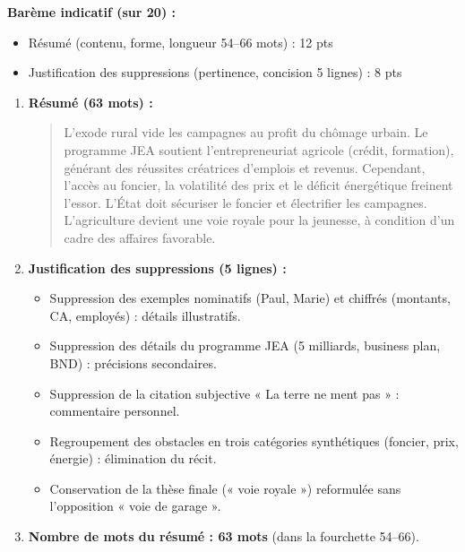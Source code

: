 \documentclass[11pt]{article}
\begin{document}
\begin{corrige}
\textbf{Barème indicatif (sur 20) :}
\begin{itemize}
    \item Résumé (contenu, forme, longueur 54--66 mots) : 12 pts
    \item Justification des suppressions (pertinence, concision 5 lignes) : 8 pts
\end{itemize}
\begin{enumerate}
    \item \textbf{Résumé (63 mots) :}
    \begin{quote}
    L'exode rural vide les campagnes au profit du chômage urbain. Le programme JEA soutient l'entrepreneuriat agricole (crédit, formation), générant des réussites créatrices d'emplois et revenus. Cependant, l'accès au foncier, la volatilité des prix et le déficit énergétique freinent l'essor. L'État doit sécuriser le foncier et électrifier les campagnes. L'agriculture devient une voie royale pour la jeunesse, à condition d'un cadre des affaires favorable.
    \end{quote}
    \item \textbf{Justification des suppressions (5 lignes) :}
    \begin{itemize}
        \item Suppression des exemples nominatifs (Paul, Marie) et chiffrés (montants, CA, employés) : détails illustratifs.
        \item Suppression des détails du programme JEA (5 milliards, business plan, BND) : précisions secondaires.
        \item Suppression de la citation subjective « La terre ne ment pas » : commentaire personnel.
        \item Regroupement des obstacles en trois catégories synthétiques (foncier, prix, énergie) : élimination du récit.
        \item Conservation de la thèse finale (« voie royale ») reformulée sans l'opposition « voie de garage ».
    \end{itemize}
    \item \textbf{Nombre de mots du résumé : 63 mots} (dans la fourchette 54--66).
\end{enumerate}
\end{corrige}
\end{document}
